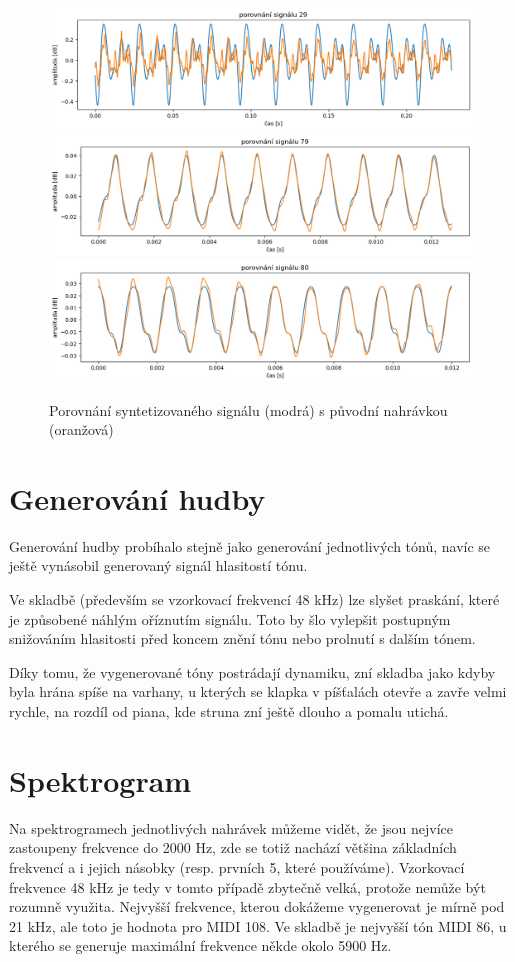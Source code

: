 \documentclass[a4paper, 12pt]{article}
\begin{document}
	\begin{figure}[H]
		\includegraphics[width=\textwidth]{src/synth_a.png}
		\includegraphics[width=\textwidth]{src/synth_b.png}
		\includegraphics[width=\textwidth]{src/synth_c.png}
		\caption{Porovnání syntetizovaného signálu (modrá) s původní nahrávkou (oranžová)}
	\end{figure}
	
	\section{Generování hudby}
	Generování hudby probíhalo stejně jako generování jednotlivých tónů, navíc se ještě vynásobil generovaný signál hlasitostí tónu.
	
	Ve skladbě (především se vzorkovací frekvencí 48 kHz) lze slyšet praskání, které je způsobené náhlým oříznutím signálu. Toto by šlo vylepšit postupným snižováním hlasitosti před koncem znění tónu nebo prolnutí s dalším tónem.
	
	Díky tomu, že vygenerované tóny postrádají dynamiku, zní skladba jako kdyby byla hrána spíše na varhany, u kterých se klapka v píšťalách otevře a zavře velmi rychle, na rozdíl od piana, kde struna zní ještě dlouho a pomalu utichá.
	
	\section{Spektrogram}
	Na spektrogramech jednotlivých nahrávek můžeme vidět, že jsou nejvíce zastoupeny frekvence do 2000 Hz, zde se totiž nachází většina základních frekvencí a i jejich násobky (resp. prvních 5, které používáme). Vzorkovací frekvence 48 kHz je tedy v tomto případě zbytečně velká, protože nemůže být rozumně využita. Nejvyšší frekvence, kterou dokážeme vygenerovat je mírně pod 21 kHz, ale toto je hodnota pro MIDI 108. Ve skladbě je nejvyšší tón MIDI 86, u kterého se generuje maximální frekvence někde okolo 5900 Hz.
	
\end{document}
